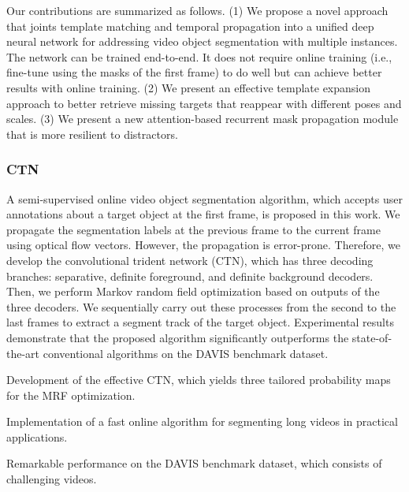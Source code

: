 Our contributions are summarized as follows. (1) We propose a novel approach that joints template matching and temporal propagation into a uniﬁed deep neural network for addressing video object segmentation with multiple instances. The network can be trained end-to-end. It does not require online training (i.e., ﬁne-tune using the masks of the ﬁrst frame) to do well but can achieve better results with online training. (2) We present an effective template expansion approach to better retrieve missing targets that reappear with different poses and scales. (3) We present a new attention-based recurrent mask propagation module that is more resilient to distractors.

\subsubsection{CTN}
A semi-supervised online video object segmentation algorithm, which accepts user annotations about a target object at the ﬁrst frame, is proposed in this work. We propagate the segmentation labels at the previous frame to the current frame using optical ﬂow vectors. However, the propagation is error-prone. Therefore, we develop the convolutional trident network (CTN), which has three decoding branches: separative, deﬁnite foreground, and deﬁnite background decoders. Then, we perform Markov random ﬁeld optimization based on outputs of the three decoders. We sequentially carry out these processes from the second to the last frames to extract a segment track of the target object. Experimental results demonstrate that the proposed algorithm signiﬁcantly outperforms the state-of-the-art conventional algorithms on the DAVIS benchmark dataset.

Development of the effective CTN, which yields three tailored probability maps for the MRF optimization.

Implementation of a fast online algorithm for segmenting long videos in practical applications.

Remarkable performance on the DAVIS benchmark dataset, which consists of challenging videos.


